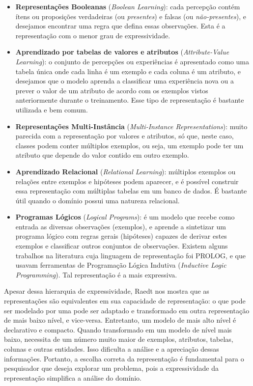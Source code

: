 \begin{itemize}
    \item \textbf{Representações Booleanas} (\textit{Boolean Learning}): cada percepção contém ítens ou proposições verdadeiras (ou \textit{presentes}) e falsas (ou \textit{não-presentes}), e desejamos encontrar uma regra que defina essas observações. Esta é a representação com o menor grau de expressividade.
    \item \textbf{Aprendizado por tabelas de valores e atributos} (\textit{Attribute-Value Learning}): o conjunto de percepções ou experiências é apresentado como uma tabela única onde cada linha é um exemplo e cada coluna é um atributo, e desejamos que o modelo aprenda a classificar uma experiência nova ou a prever o valor de um atributo de acordo com os exemplos vistos anteriormente durante o treinamento. Esse tipo de representação é bastante utilizada e bem comum.
    \item \textbf{Representações Multi-Instância} (\textit{Multi-Instance Representations}): muito parecida com a representação por valores e atributos, só que, neste caso, classes podem conter múltiplos exemplos, ou seja, um exemplo pode ter um atributo que depende do valor contido em outro exemplo.
    \item \textbf{Aprendizado Relacional} (\textit{Relational Learning}): múltiplos exemplos ou relações entre exemplos e hipóteses podem aparecer, e é possível construir essa representação com múltiplas tabelas em um banco de dados. É bastante útil quando o domínio possui uma natureza relacional.
    \item \textbf{Programas Lógicos}  (\textit{Logical Programs}): é um modelo que recebe como entrada as diversas observações (exemplos), e aprende a sintetizar um programa lógico com regras gerais (hipóteses) capazes de derivar estes exemplos e classificar outros conjuntos de observações. Existem alguns trabalhos na literatura cuja linguagem de representação foi PROLOG, e que usavam ferramentas de Programação Lógica Indutiva (\textit{Inductive Logic Programming}). Tal representação é a mais expressiva.
\end{itemize}

Apesar dessa hierarquia de expressividade, Raedt nos mostra que as representações são equivalentes em sua capacidade de representação: o que pode ser modelado por uma pode ser adaptado e transformado em outra representação de mais baixo nível, e vice-versa. Entretanto, um modelo de mais alto nível é declarativo e compacto. Quando transformado em um modelo de nível mais baixo, necessita de um número muito maior de exemplos, atributos, tabelas, colunas e outras entidades. Isso dificulta a análise e a apreciação dessas informações. Portanto, a escolha correta da representação é fundamental para o pesquisador que deseja explorar um problema, pois a expressividade da representação simplifica a análise do domínio.

